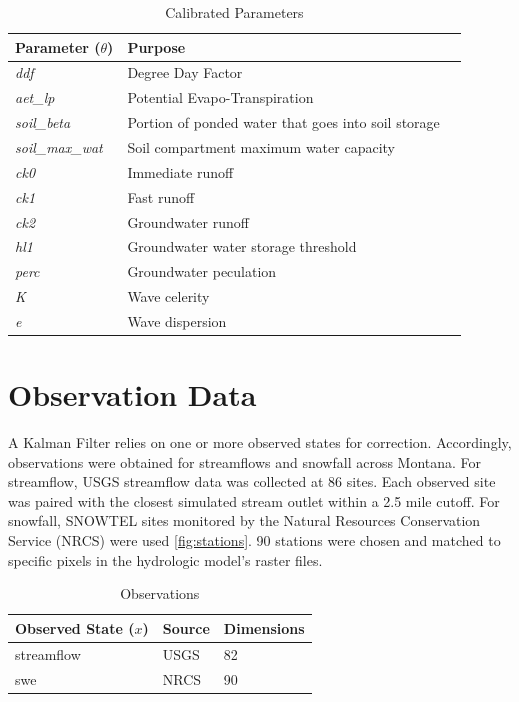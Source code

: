 \begin{table}[]
\caption{Calibrated Parameters} 
\begin{tabular}{lll}
Parameter ($\theta$) & Purpose \\ \hline
\textit{ddf}                  & Degree Day Factor \\
\textit{aet\_lp}              & Potential Evapo-Transpiration  \\
\textit{soil\_beta}          & Portion of ponded water that goes into soil storage \\
\textit{soil\_max\_wat}       & Soil compartment maximum water capacity \\
\textit{ck0}       & Immediate runoff \\
\textit{ck1}      & Fast runoff \\
\textit{ck2}       & Groundwater runoff \\
\textit{hl1}       & Groundwater water storage threshold \\
\textit{perc}       & Groundwater peculation \\
\textit{K}        & Wave celerity \\
\textit{e}       & Wave dispersion \\
\end{tabular}
\label{tab:t_params}
\end{table}



\section{Observation Data}

A Kalman Filter relies on one or more observed states for correction. Accordingly, observations were obtained for streamflows and snowfall across Montana. For streamflow, USGS streamflow data was collected at 86 sites. Each observed site was paired with the closest simulated stream outlet within a 2.5 mile cutoff. For snowfall, SNOWTEL sites monitored by the Natural Resources Conservation Service (NRCS) were used \ref{fig:stations}. 90 stations were chosen and matched to specific pixels in the hydrologic model's raster files.


\begin{table}[]
\caption{Observations} 
\begin{tabular}{lll}
Observed State ($x$) & Source                              & Dimensions  \\ \hline
streamflow  & USGS & 82   \\
swe         & NRCS & 90
\end{tabular}
\label{tab:obs}
\end{table}

